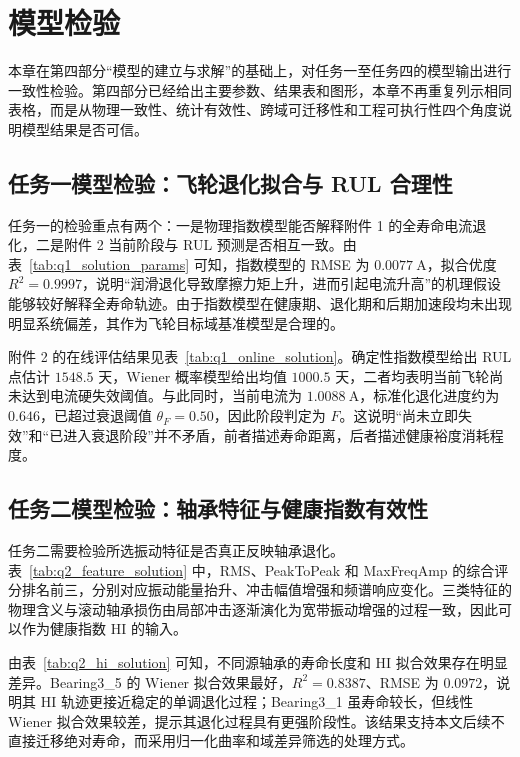 \section{模型检验}

本章在第四部分“模型的建立与求解”的基础上，对任务一至任务四的模型输出进行一致性检验。第四部分已经给出主要参数、结果表和图形，本章不再重复列示相同表格，而是从物理一致性、统计有效性、跨域可迁移性和工程可执行性四个角度说明模型结果是否可信。

\subsection{任务一模型检验：飞轮退化拟合与 RUL 合理性}

任务一的检验重点有两个：一是物理指数模型能否解释附件 1 的全寿命电流退化，二是附件 2 当前阶段与 RUL 预测是否相互一致。由表~\ref{tab:q1_solution_params} 可知，指数模型的 RMSE 为 $0.0077\ \mathrm A$，拟合优度 $R^2=0.9997$，说明“润滑退化导致摩擦力矩上升，进而引起电流升高”的机理假设能够较好解释全寿命轨迹。由于指数模型在健康期、退化期和后期加速段均未出现明显系统偏差，其作为飞轮目标域基准模型是合理的。

附件 2 的在线评估结果见表~\ref{tab:q1_online_solution}。确定性指数模型给出 RUL 点估计 $1548.5$ 天，Wiener 概率模型给出均值 $1000.5$ 天，二者均表明当前飞轮尚未达到电流硬失效阈值。与此同时，当前电流为 $1.0088\ \mathrm A$，标准化退化进度约为 $0.646$，已超过衰退阈值 $\theta_F=0.50$，因此阶段判定为 $F$。这说明“尚未立即失效”和“已进入衰退阶段”并不矛盾，前者描述寿命距离，后者描述健康裕度消耗程度。

\subsection{任务二模型检验：轴承特征与健康指数有效性}

任务二需要检验所选振动特征是否真正反映轴承退化。表~\ref{tab:q2_feature_solution} 中，RMS、PeakToPeak 和 MaxFreqAmp 的综合评分排名前三，分别对应振动能量抬升、冲击幅值增强和频谱响应变化。三类特征的物理含义与滚动轴承损伤由局部冲击逐渐演化为宽带振动增强的过程一致，因此可以作为健康指数 HI 的输入。

由表~\ref{tab:q2_hi_solution} 可知，不同源轴承的寿命长度和 HI 拟合效果存在明显差异。Bearing3\_5 的 Wiener 拟合效果最好，$R^2=0.8387$、RMSE 为 $0.0972$，说明其 HI 轨迹更接近稳定的单调退化过程；Bearing3\_1 虽寿命较长，但线性 Wiener 拟合效果较差，提示其退化过程具有更强阶段性。该结果支持本文后续不直接迁移绝对寿命，而采用归一化曲率和域差异筛选的处理方式。

